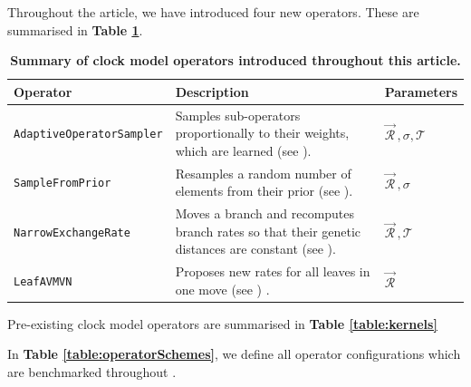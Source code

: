 \documentclass[10pt,letterpaper]{article}
\begin{document}
Throughout the article, we have introduced four new operators. 
These are summarised in \textbf{Table \ref{table:newOperators}}.


\begin{table}[h!]
\centering
\caption{\bf{Summary of clock model operators introduced throughout this article. }}
\begin{tabular}{l p{4cm} l} 
 Operator & Description & Parameters  \\
  \hline
 \texttt{AdaptiveOperatorSampler} & Samples sub-operators proportionally to their weights, which are learned (see \nameref{sect:adaptiveSampling}). & $\vec{\mathcal{R}}^{\,}, \sigma, \mathcal{T}$ \\
  \hline
 \texttt{SampleFromPrior} & Resamples a random number of elements from their prior (see \nameref{sect:adaptiveSampling}). & $\vec{\mathcal{R}}^{\,}, \sigma$ \\
  \hline
 \texttt{NarrowExchangeRate} & Moves a branch and recomputes branch rates so that their genetic distances are constant (see \nameref{sect:NER}). & $\vec{\mathcal{R}}^{\,}, \mathcal{T}$\\
  \hline
 \texttt{LeafAVMVN}  & Proposes new rates for all leaves in one move (see \nameref{AVMVN_sect}) \cite{baele2017adaptive}. & $\vec{\mathcal{R}}^{\,}$ \\
\end{tabular}
\begin{flushleft}
Pre-existing clock model operators are summarised in \textbf{Table \ref{table:kernels}}
\end{flushleft}
\label{table:newOperators}
\end{table}


In \textbf{Table \ref{table:operatorSchemes}}, we define all operator configurations which are benchmarked throughout \textbf{}.
\end{document}
